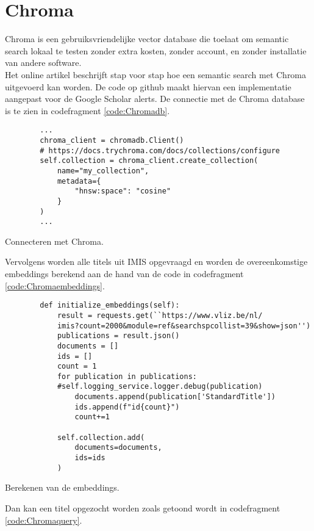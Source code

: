 \section{Chroma}
Chroma \autocite{Chroma2025} is een gebruiksvriendelijke vector database die toelaat om semantic search lokaal te testen zonder extra kosten, zonder account, en zonder installatie van andere software.\\
Het online artikel \textcite{Usechroma2025} beschrijft stap voor stap hoe een semantic search met Chroma uitgevoerd kan worden. 
De code op github \textcite{Depaepechroma2025} maakt hiervan een implementatie aangepast voor de Google Scholar alerts.
De connectie met de Chroma database is te zien in codefragment \ref{code:Chromadb}.
\begin{listing}[h!]
    \begin{verbatim}
        ...
        chroma_client = chromadb.Client()
        # https://docs.trychroma.com/docs/collections/configure
        self.collection = chroma_client.create_collection(
            name="my_collection",
            metadata={
                "hnsw:space": "cosine"
            }
        )
        ...
    \end{verbatim}
    \caption[Connect Chroma]{Connecteren met Chroma.}
    \label{code:Chromadb}
\end{listing}
Vervolgens worden alle titels uit IMIS opgevraagd en worden de overeenkomstige embeddings berekend aan de hand van de code in codefragment \ref{code:Chromaembeddings}.
\begin{listing}
    \begin{verbatim}
        def initialize_embeddings(self):
            result = requests.get(``https://www.vliz.be/nl/
            imis?count=2000&module=ref&searchspcollist=39&show=json'')
            publications = result.json()
            documents = []
            ids = []
            count = 1
            for publication in publications:
            #self.logging_service.logger.debug(publication)
                documents.append(publication['StandardTitle'])
                ids.append(f"id{count}")
                count+=1
        
            self.collection.add(
                documents=documents,
                ids=ids
            )
    \end{verbatim}
    \caption[Chroma embeddings]{Berekenen van de embeddings.}
    \label{code:Chromaembeddings}
\end{listing}
Dan kan een titel opgezocht worden zoals getoond wordt in codefragment \ref{code:Chromaquery}.
